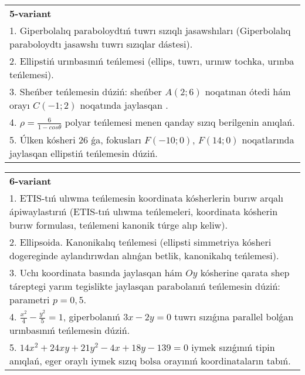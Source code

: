 \documentclass{article}
\begin{document}
\begin{tabular}{m{17cm}}
\textbf{5-variant}\\
1. Giperbolalıq paraboloydtıń tuwrı sızıqlı jasawshıları (Giperbolalıq paraboloydtı jasawshı tuwrı sızıqlar dástesi).\\

2. Ellipstiń urınbasınıń teńlemesi (ellips, tuwrı, urınıw tochka, urınba teńlemesi).\\

3. Sheńber teńlemesin dúziń: sheńber $A (2;6 ) $ noqatınan ótedi hám orayı $C (-1;2) $ noqatında jaylasqan .\\

4. $\rho = \frac{6}{1 - cos\theta}$ polyar teńlemesi menen qanday sızıq berilgenin anıqlań.  \\

5. Úlken kósheri 26 ǵa, fokusları $F( - 10;0)$, $F(14;0)$ noqatlarında jaylasqan ellipstiń teńlemesin dúziń.  
\end{tabular}
\vspace{1cm}


\begin{tabular}{m{17cm}}
\textbf{6-variant}\\
1. ETIS-tıń ulıwma teńlemesin koordinata kósherlerin burıw arqalı ápiwaylastırıń (ETIS-tıń ulıwma teńlemeleri, koordinata kósherin burıw formulası, teńlemeni kanonik túrge alıp keliw).\\

2. Ellipsoida. Kanonikalıq teńlemesi (ellipsti simmetriya kósheri dogereginde aylandırıwdan alınǵan betlik, kanonikalıq teńlemesi).\\

3. Uchı koordinata basında jaylasqan hám $Oy$ kósherine qarata shep táreptegi yarım tegislikte jaylasqan parabolanıń teńlemesin dúziń: parametri $p=0,5$.\\

4. $\frac{x^{2}}{4} - \frac{y^{2}}{5} = 1$, giperbolanıń $3x - 2y = 0$ tuwrı sızıǵına parallel bolǵan urınbasınıń teńlemesin dúziń.  \\

5. $14x^{2} + 24xy + 21y^{2} - 4x + 18y - 139 = 0$ iymek sızıǵınıń tipin anıqlań, eger oraylı iymek sızıq bolsa orayınıń koordinataların tabıń.  
\end{tabular}
\vspace{1cm}
\end{document}
